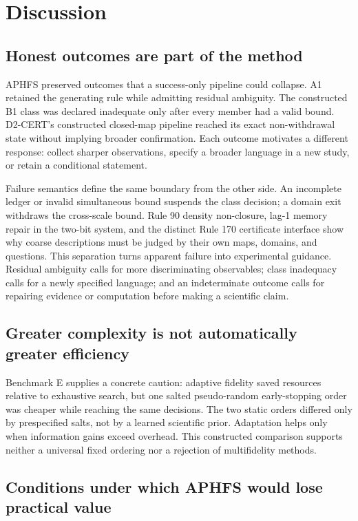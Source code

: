 \documentclass[10pt]{article}
\theoremstyle{definition}
\begin{document}
\section{Discussion}

\subsection{Honest outcomes are part of the method}

APHFS preserved outcomes that a success-only pipeline could collapse. A1 retained the generating
rule while admitting residual ambiguity. The constructed B1 class was declared inadequate only
after every member had a valid bound. D2-CERT's constructed closed-map pipeline reached its exact
non-withdrawal state without implying broader confirmation. Each outcome motivates a different
response: collect sharper observations, specify a
broader language in a new study, or retain a conditional statement.

Failure semantics define the same boundary from the other side. An incomplete ledger or invalid
simultaneous bound suspends the class decision; a domain exit withdraws the cross-scale bound.
Rule 90 density non-closure, lag-1 memory repair in the two-bit system, and the distinct Rule 170
certificate interface show why coarse descriptions must be judged by their own maps, domains, and
questions.
This separation turns apparent failure into experimental guidance. Residual ambiguity calls for
more discriminating observables; class inadequacy calls for a newly specified language; and an
indeterminate outcome calls for repairing evidence or computation before making a scientific
claim.

\subsection{Greater complexity is not automatically greater efficiency}

Benchmark E supplies a concrete caution: adaptive fidelity saved resources relative to exhaustive
search, but one salted pseudo-random early-stopping order was cheaper while reaching the same
decisions. The two static orders differed only by prespecified salts, not by a learned scientific
prior. Adaptation helps only when information gains exceed overhead. This constructed comparison
supports neither a universal fixed ordering nor a rejection of multifidelity methods.

\subsection{Conditions under which APHFS would lose practical value}
\end{document}
